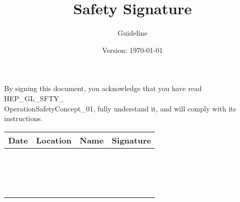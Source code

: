 \documentclass{article}
\title{Safety Signature}
\author{Guideline}
\date{Version: \isodate\today}
\begin{document}
\maketitle

\thispagestyle{fancy}
\noindent
By signing this document, you acknowledge that you have read HEP\_GL\_SFTY\_ \\ OperationSafetyConcept\_01, fully understand it, and will comply with its instructions. 
\renewcommand{\arraystretch}{2}
\begin{tabularx}{\textwidth}{|X|X|X|X|}
    \hline
    \rowcolor{tableHeaderColor} 
    \begin{minipage}[t]{\linewidth}
        \textbf{Date} 
    \end{minipage}
    & 
    \textbf{Location} 
    & 
    \textbf{Name} 
    & 
    \textbf{Signature} 
    \\ \hline
    & & & \\ \hline
    & & & \\ \hline
    & & & \\ \hline
    & & & \\ \hline
    & & & \\ \hline
    & & & \\ \hline
    & & & \\ \hline
    & & & \\ \hline
    & & & \\ \hline
    & & & \\ \hline
    & & & \\ \hline
    & & & \\ \hline
    & & & \\ \hline
    & & & \\ \hline
    & & & \\ \hline
    & & & \\ \hline
\end{tabularx}
\end{document}
